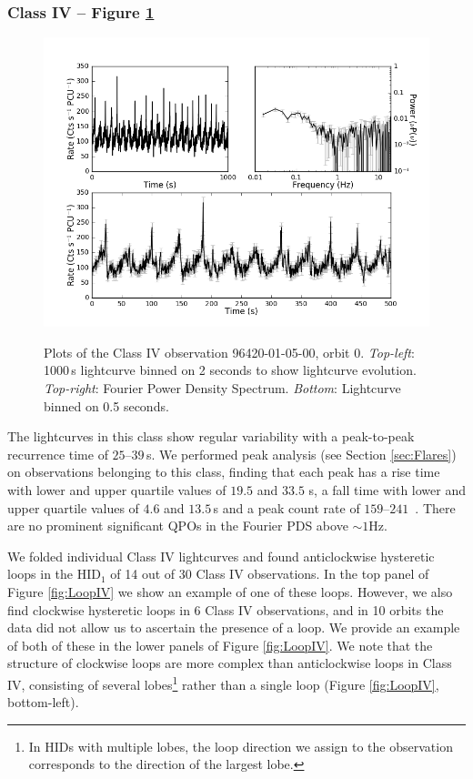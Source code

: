 \subsubsection{Class IV -- Figure \ref{fig:Jmulti}}
\label{sec:classIV}

\begin{figure}
    \includegraphics[width=0.8\columnwidth, trim = 0.6cm 0 3.9cm 0]{images/Jmulti.png}\\
    \captionsetup{singlelinecheck=off}
    \caption{Plots of the Class IV observation 96420-01-05-00, orbit 0.  \textit{Top-left}: 1000\,s lightcurve binned on 2 seconds to show lightcurve evolution.  \textit{Top-right}: Fourier Power Density Spectrum.  \textit{Bottom}: Lightcurve binned on 0.5 seconds.}
   \label{fig:Jmulti}
\end{figure}

\par The lightcurves in this class show regular variability with a peak-to-peak recurrence time of $25$--$39$\,s.  We performed peak analysis (see Section \ref{sec:Flares}) on observations belonging to this class, finding that each peak has a rise time with lower and upper quartile values of $19.5$ and $33.5$ s, a fall time with lower and upper quartile values of $4.6$ and $13.5$\,s and a peak count rate of $159$--$241$\spcu\ .  There are no prominent significant QPOs in the Fourier PDS above $\sim1$Hz.
\par We folded individual Class IV lightcurves and found anticlockwise hysteretic loops in the HID$_1$ of 14 out of 30 Class IV observations.  In the top panel of Figure \ref{fig:LoopIV} we show an example of one of these loops.  However, we also find clockwise hysteretic loops in 6 Class IV observations, and in 10 orbits the data did not allow us to ascertain the presence of a loop.  We provide an example of both of these in the lower panels of Figure \ref{fig:LoopIV}.  We note that the structure of clockwise loops are more complex than anticlockwise loops in Class IV, consisting of several lobes\footnote{In HIDs with multiple lobes, the loop direction we assign to the observation corresponds to the direction of the largest lobe.} rather than a single loop (Figure \ref{fig:LoopIV}, bottom-left).

